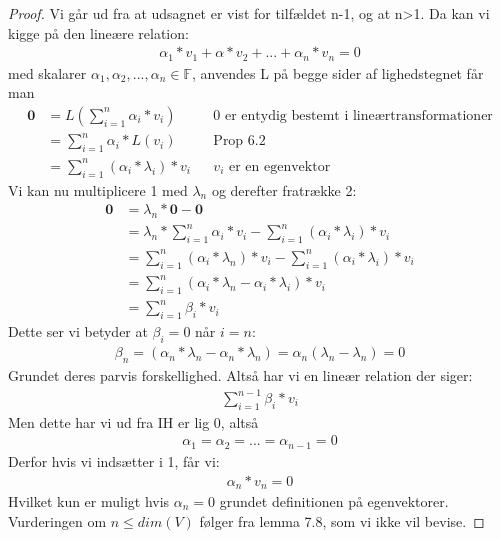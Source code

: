 \documentclass[paper=a4, fontsize=11pt]{scrartcl} %
\begin{document}
			
			\begin{proof}
				Vi går ud fra at udsagnet er vist for tilfældet n-1, og at n>1. Da kan vi kigge på den lineære relation:
				\setcounter{equation}{0}
				\begin{gather}
				\alpha_1*v_1+\alpha*v_2+...+\alpha_n*v_n=0
				\end{gather} 
				med skalarer $\alpha_1,\alpha_2,...,\alpha_n\in\mathbb{F}$, anvendes L på begge sider af lighedstegnet får man
				\begin{align}
				\mathbf{0}&=L(\sum_{i=1}^{n}\alpha_i*v_i) &&\text{0 er entydig bestemt i lineærtransformationer} \\
				&=\sum_{i=1}^{n}\alpha_i*L(v_i) &&\text{Prop 6.2} \\
				&=\sum_{i=1}^{n}(\alpha_i*\lambda_i)*v_i&&\text{$v_i$ er en egenvektor}
				\end{align}
				Vi kan nu multiplicere 1 med $\lambda_n$ og derefter fratrække 2:
				\begin{align*}
				\mathbf{0}&=\lambda_n*\mathbf{0}-\mathbf{0} \\
				&=\lambda_n*\sum_{i=1}^{n}\alpha_i*v_i-\sum_{i=1}^{n}(\alpha_i*\lambda_i)*v_i \\
				&=\sum_{i=1}^{n}(\alpha_i*\lambda_n)*v_i-\sum_{i=1}^{n}(\alpha_i*\lambda_i)*v_i \\
				&=\sum_{i=1}^{n}(\alpha_i*\lambda_n-\alpha_i*\lambda_i)*v_i \\
				&=\sum_{i=1}^{n}\beta_i*v_i
				\end{align*}
				Dette ser vi betyder at $\beta_i=0$ når $i=n$:
				\begin{align*}
				\beta_n=(\alpha_n*\lambda_n-\alpha_n*\lambda_n)=\alpha_n(\lambda_n-\lambda_n)=0
				\end{align*}
				Grundet deres parvis forskellighed. Altså har vi en lineær relation der siger:
				\begin{align*}
				\sum_{i=1}^{n-1}\beta_i*v_i
				\end{align*}
				Men dette har vi ud fra IH er lig 0, altså
				\begin{align*}
				\alpha_1=\alpha_2=...=\alpha_{n-1}=0
				\end{align*}
				Derfor hvis vi indsætter i 1, får vi:
				\begin{align*}
				\alpha_n*v_n=0
				\end{align*}
				Hvilket kun er muligt hvis $\alpha_n=0$ grundet definitionen på egenvektorer. Vurderingen om $n\leq dim(V)$ følger fra lemma 7.8, som vi ikke vil bevise.
				
			\end{proof}
			
\end{document}
